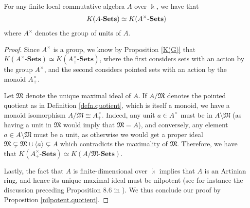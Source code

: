 \documentclass[11pt]{amsart}
\begin{document}
    \begin{proposition}\label{prop.comm.local.algebras}
        For any finite local commutative algebra $A$ over $\Bbbk$, we have that $$K(A\text{-}\mathbf{Sets})\simeq K(A^\times\text{-}\mathbf{Sets})$$ where $A^\times$ denotes the group of units of $A$.
    \end{proposition}
    \begin{proof}
        Since $A^\times$ is a group, we know by Proposition \ref{K(G)} that $K(A^\times\text{-}\mathbf{Sets})\simeq K(A^\times_+\text{-}\mathbf{Sets})$, where the first considers sets with an action by the group $A^\times$, and the second considers pointed sets with an action by the monoid $A^\times_+$. 
        
        Let $\mathfrak{M}$ denote the unique maximal ideal of $A$. If $A/\mathfrak{M}$ denotes the pointed quotient as in Definition \ref{defn.quotient}, which is itself a monoid, we have a monoid isomorphism $A/\mathfrak{M}\cong A^\times_+$. Indeed, any unit $a\in A^\times$ must be in $A\setminus\mathfrak{M}$ (as having a unit in $\mathfrak{M}$ would imply that $\mathfrak{M}=A$), and conversely, any element $a\in A\setminus\mathfrak{M}$ must be a unit, as otherwise we would get a proper ideal $\mathfrak{M}\subsetneq \mathfrak{M}\cup\langle a\rangle\subsetneq A$ which contradicts the maximality of $\mathfrak{M}$. Therefore, we have that $K(A^\times_+\text{-}\mathbf{Sets})\simeq K(A/\mathfrak{M}\text{-}\mathbf{Sets})$.

        Lastly, the fact that $A$ is finite-dimensional over $\Bbbk$ implies that $A$ is an Artinian ring, and hence its unique maximal ideal must be nilpotent (see for instance the discussion preceding Proposition 8.6 in \cite{atiyahMcdonald}). We thus conclude our proof by Proposition \ref{nilpotent.quotient}.
    \end{proof}



\end{document}
